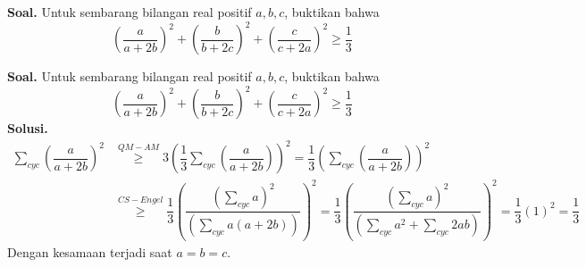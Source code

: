 \documentclass{extarticle}
\date{}
\begin{document}
	

	
		 \textbf{Soal. } Untuk sembarang bilangan real positif $a,b,c$, buktikan bahwa 
		 $$\left(\dfrac{a}{a+2b} \right)^2+\left(\dfrac{b}{b+2c} \right)^2+\left(\dfrac{c}{c+2a} \right)^2 \ge \dfrac{1}{3}$$
	
	\newpage
	
	\textbf{Soal. } Untuk sembarang bilangan real positif $a,b,c$, buktikan bahwa 
	$$\left(\dfrac{a}{a+2b} \right)^2+\left(\dfrac{b}{b+2c} \right)^2+\left(\dfrac{c}{c+2a} \right)^2 \ge \dfrac{1}{3}$$
	\textbf{Solusi. }
	\begin{align*}
		\sum_{cyc} \left(\dfrac{a}{a+2b} \right)^2 
		 &\overset{QM-AM}{\ge} 3\left(\dfrac{1}{3}\sum_{cyc} \left(\dfrac{a}{a+2b} \right)\right)^2
		 = \dfrac{1}{3}\left(\sum_{cyc} \left(\dfrac{a}{a+2b} \right)\right)^2\\
		 &\overset{CS-Engel}{\ge} \dfrac{1}{3}\left(\dfrac{\left(\sum_{cyc}a\right)^2}{\left(\sum_{cyc}a(a+2b)\right)} \right)^2
		 = \dfrac{1}{3}\left(\dfrac{\left(\sum_{cyc}a\right)^2}{\left(\sum_{cyc}a^2+\sum_{cyc}2ab\right)} \right)^2
		 = \dfrac{1}{3}(1)^2 = \dfrac{1}{3}
	\end{align*}
	Dengan kesamaan terjadi saat $a=b=c$.
	$$$$
\end{document}
